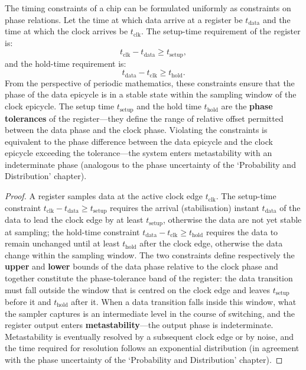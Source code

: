 \begin{proposition}\label{prop:chip_timing_constraints}
The timing constraints of a chip can be formulated uniformly as constraints on phase relations. Let the time at which data arrive at a register be $t_{\text{data}}$ and the time at which the clock arrives be $t_{\text{clk}}$. The setup-time requirement of the register is:
\[
t_{\text{clk}} - t_{\text{data}} \ge t_{\text{setup}},
\]
and the hold-time requirement is:
\[
t_{\text{data}} - t_{\text{clk}} \ge t_{\text{hold}}.
\]
From the perspective of periodic mathematics, these constraints ensure that the phase of the data epicycle is in a stable state within the sampling window of the clock epicycle. The setup time $t_{\text{setup}}$ and the hold time $t_{\text{hold}}$ are the \textbf{phase tolerances} of the register---they define the range of relative offset permitted between the data phase and the clock phase. Violating the constraints is equivalent to the phase difference between the data epicycle and the clock epicycle exceeding the tolerance---the system enters metastability with an indeterminate phase (analogous to the phase uncertainty of the `Probability and Distribution' chapter).
\end{proposition}

\begin{proof}
A register samples data at the active clock edge $t_{\text{clk}}$. The setup-time constraint $t_{\text{clk}} - t_{\text{data}} \ge t_{\text{setup}}$ requires the arrival (stabilisation) instant $t_{\text{data}}$ of the data to lead the clock edge by at least $t_{\text{setup}}$, otherwise the data are not yet stable at sampling; the hold-time constraint $t_{\text{data}} - t_{\text{clk}} \ge t_{\text{hold}}$ requires the data to remain unchanged until at least $t_{\text{hold}}$ after the clock edge, otherwise the data change within the sampling window. The two constraints define respectively the \textbf{upper} and \textbf{lower} bounds of the data phase relative to the clock phase and together constitute the phase-tolerance band of the register: the data transition must fall outside the window that is centred on the clock edge and leaves $t_{\text{setup}}$ before it and $t_{\text{hold}}$ after it. When a data transition falls inside this window, what the sampler captures is an intermediate level in the course of switching, and the register output enters \textbf{metastability}---the output phase is indeterminate. Metastability is eventually resolved by a subsequent clock edge or by noise, and the time required for resolution follows an exponential distribution (in agreement with the phase uncertainty of the `Probability and Distribution' chapter).
\end{proof}

